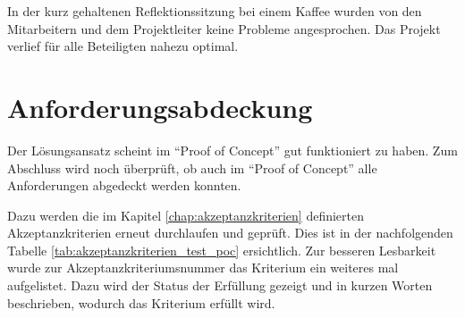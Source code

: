In der kurz gehaltenen Reflektionssitzung bei einem Kaffee wurden von den Mitarbeitern
und dem Projektleiter keine Probleme angesprochen. Das Projekt verlief für 
alle Beteiligten nahezu optimal.

\section{Anforderungsabdeckung}
Der Lösungsansatz scheint im ``Proof of Concept'' gut funktioniert zu haben.
Zum Abschluss wird noch überprüft, ob auch im ``Proof of Concept'' alle 
Anforderungen abgedeckt werden konnten.

Dazu werden die im Kapitel \ref{chap:akzeptanzkriterien} definierten 
Akzeptanzkriterien erneut durchlaufen und geprüft. Dies ist in der nachfolgenden Tabelle 
\ref{tab:akzeptanzkriterien_test_poc} ersichtlich. Zur besseren Lesbarkeit wurde zur 
Akzeptanzkriteriumsnummer das Kriterium ein weiteres mal aufgelistet. Dazu wird 
der Status der Erfüllung gezeigt und in kurzen Worten beschrieben, wodurch das
Kriterium erfüllt wird.

